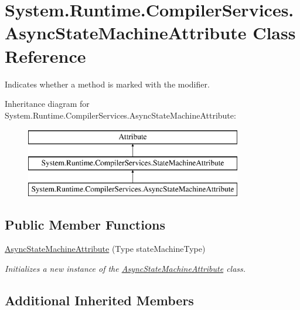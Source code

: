 \hypertarget{class_system_1_1_runtime_1_1_compiler_services_1_1_async_state_machine_attribute}{}\section{System.\+Runtime.\+Compiler\+Services.\+Async\+State\+Machine\+Attribute Class Reference}
\label{class_system_1_1_runtime_1_1_compiler_services_1_1_async_state_machine_attribute}


Indicates whether a method is marked with the  modifier.  


Inheritance diagram for System.\+Runtime.\+Compiler\+Services.\+Async\+State\+Machine\+Attribute\+:\begin{figure}[H]
\begin{center}
\leavevmode
\includegraphics[height=3.000000cm]{class_system_1_1_runtime_1_1_compiler_services_1_1_async_state_machine_attribute}
\end{center}
\end{figure}
\subsection*{Public Member Functions}
\begin{DoxyCompactItemize}
\item 
\hyperlink{class_system_1_1_runtime_1_1_compiler_services_1_1_async_state_machine_attribute_a8e202c630389a1f224dbf15c66b50852}{Async\+State\+Machine\+Attribute} (Type state\+Machine\+Type)
\begin{DoxyCompactList}\small\item\em Initializes a new instance of the \hyperlink{class_system_1_1_runtime_1_1_compiler_services_1_1_async_state_machine_attribute}{Async\+State\+Machine\+Attribute} class. \end{DoxyCompactList}\end{DoxyCompactItemize}
\subsection*{Additional Inherited Members}


